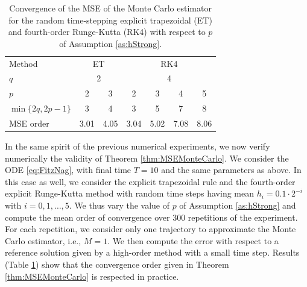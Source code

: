 \documentclass{siamart1116}
\numberwithin{theorem}{section}
\begin{document}
\begin{table}[t!]
	\centering
	\begin{tabular}{lcccccc}
		\toprule
		Method & \multicolumn{2}{c}{ET} & \multicolumn{4}{c}{RK4} \\ 
		\cmidrule(l{2pt}r{2pt}){2-3} \cmidrule(l{2pt}r{2pt}){4-7} 
		$q$ & \multicolumn{2}{c}{2} & \multicolumn{4}{c}{4} \\
		$p$ & 2 & 3 & 2 & 3 & 4 & 5\\
		$\min\{2q, 2p - 1\}$ & 3 & 4 & 3 & 5 & 7 & 8\\
		MSE order & 3.01 & 4.05 & 3.04 & 5.02 & 7.08 & 8.06\\
		\bottomrule
	\end{tabular}
	\caption{Convergence of the MSE of the Monte Carlo estimator for the random time-stepping explicit trapezoidal (ET) and fourth-order Runge-Kutta (RK4) with respect to $p$ of Assumption \ref{as:hStrong}.}
	\label{tab:NumericalResultsMSE}
\end{table}

In the same spirit of the previous numerical experiments, we now verify numerically the validity of Theorem \ref{thm:MSEMonteCarlo}. We consider the ODE \eqref{eq:FitzNag}, with final time $T = 10$ and the same parameters as above. In this case as well, we consider the explicit trapezoidal rule and the fourth-order explicit Runge-Kutta method with random time steps having mean $h_i = 0.1\cdot 2^{-i}$ with $i = 0, 1, \ldots, 5$. We thus vary the value of $p$ of Assumption \ref{as:hStrong} and compute the mean order of convergence over 300 repetitions of the experiment. For each repetition, we consider only one trajectory to approximate the Monte Carlo estimator, i.e., $M = 1$. We then compute the error with respect to a reference solution given by a high-order method with a small time step. Results (Table \ref{tab:NumericalResultsMSE}) show that the convergence order given in Theorem \ref{thm:MSEMonteCarlo} is respected in practice.
\end{document}
